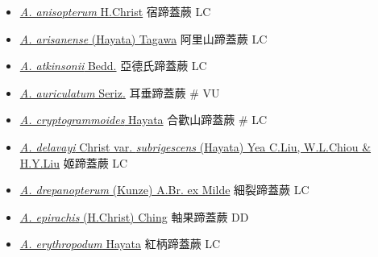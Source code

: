 \begin{itemize}
  \begin{itemize}
        \item[] \href{http://www.theplantlist.org/tpl1.1/search?q=Athyrium+anisopterum}{\textit{A. anisopterum} H.Christ}   宿蹄蓋蕨   LC
        \item[] \href{http://www.theplantlist.org/tpl1.1/search?q=Athyrium+arisanense}{\textit{A. arisanense} (Hayata) Tagawa}   阿里山蹄蓋蕨   LC
        \item[] \href{http://www.theplantlist.org/tpl1.1/search?q=Athyrium+atkinsonii}{\textit{A. atkinsonii} Bedd.}   亞德氏蹄蓋蕨   LC
        \item[] \href{http://www.theplantlist.org/tpl1.1/search?q=Athyrium+auriculatum}{\textit{A. auriculatum} Seriz.}   耳垂蹄蓋蕨  \# VU
        \item[] \href{http://www.theplantlist.org/tpl1.1/search?q=Athyrium+cryptogrammoides}{\textit{A. cryptogrammoides} Hayata}   合歡山蹄蓋蕨  \# LC
        \item[] \href{http://www.theplantlist.org/tpl1.1/search?q=Athyrium+delavayi+var.+subrigescens}{\textit{A. delavayi} Christ var. \textit{subrigescens} (Hayata) Yea C.Liu, W.L.Chiou \& H.Y.Liu}  
                                        姬蹄蓋蕨   LC
        \item[] \href{http://www.theplantlist.org/tpl1.1/search?q=Athyrium+drepanopterum}{\textit{A. drepanopterum} (Kunze) A.Br. ex Milde}   細裂蹄蓋蕨   LC
        \item[] \href{http://www.theplantlist.org/tpl1.1/search?q=Athyrium+epirachis}{\textit{A. epirachis} (H.Christ) Ching}   軸果蹄蓋蕨   DD
        \item[] \href{http://www.theplantlist.org/tpl1.1/search?q=Athyrium+erythropodum}{\textit{A. erythropodum} Hayata}   紅柄蹄蓋蕨   LC

\end{itemize}
\end{itemize}
